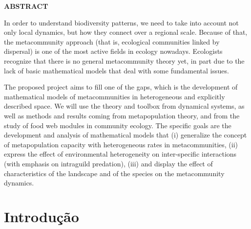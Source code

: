 \documentclass[12pt]{extarticle}
\begin{document}
\setlength{\parindent}{20pt}
\thispagestyle{empty}
\begin{center}
    \bf \Large \color{blue} ABSTRACT
\end{center}
\vskip 3.0cm
{\it

    In order to understand biodiversity patterns, we need to take into account
    not only local dynamics, but how they connect over a regional scale.
    Because of that, the metacommunity approach (that is, ecological
    communities linked by dispersal) is one of the most active fields in
    ecology nowadays. Ecologists recognize that there is no general
    metacommunity theory yet, in part due to the lack of basic mathematical
    models that deal with some fundamental issues.

    The proposed project aims to fill one of the gaps, which is the
    development of mathematical models of metacommunities in heterogeneous and
    explicitly described space. We will use the theory and toolbox from
    dynamical systems, as well as methods and results coming from
    metapopulation theory, and from the study of food web modules in
    community ecology. The specific goals are the development and analysis of
    mathematical models that
    (i) generalize the concept of metapopulation capacity with heterogeneous
    rates in metacommunities,
    (ii) express the effect of environmental heterogeneity on inter-specific
    interactions (with emphasis on intraguild predation),
    (iii) and display the effect of characteristics of the landscape and of
    the species on the metacommunity dynamics.

%

}

\newpage
\setcounter{page}{1}
\onehalfspacing

\section{Introdução}
\end{document}
